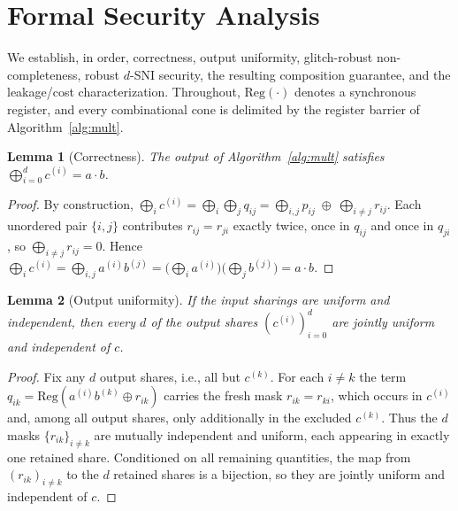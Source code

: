 \documentclass[lettersize,journal]{IEEEtran}
\newtheorem{lemma}{Lemma}
\newcommand{\share}[2]{#1^{(#2)}}
\begin{document}
\section{Formal Security Analysis}
\label{sec:security}
We establish, in order, correctness, output uniformity, glitch-robust
non-completeness, robust $d$-SNI security, the resulting composition guarantee,
and the leakage/cost characterization. Throughout, $\mathrm{Reg}(\cdot)$ denotes
a synchronous register, and every combinational cone is delimited by the
register barrier of Algorithm~\ref{alg:mult}.

\begin{lemma}[Correctness]
\label{lem:correct}
The output of Algorithm~\ref{alg:mult} satisfies
$\bigoplus_{i=0}^{d}\share{c}{i}=a\cdot b$.
\end{lemma}
\begin{proof}
By construction,
$\bigoplus_i\share{c}{i}=\bigoplus_{i}\bigoplus_{j}q_{ij}
=\bigoplus_{i,j}p_{ij}\;\oplus\;\bigoplus_{i\neq j}r_{ij}$.
Each unordered pair $\{i,j\}$ contributes $r_{ij}=r_{ji}$ exactly twice, once in
$q_{ij}$ and once in $q_{ji}$, so $\bigoplus_{i\neq j}r_{ij}=0$. Hence
$\bigoplus_i\share{c}{i}=\bigoplus_{i,j}\share{a}{i}\share{b}{j}
=\big(\bigoplus_i\share{a}{i}\big)\big(\bigoplus_j\share{b}{j}\big)=a\cdot b$.
\end{proof}

\begin{lemma}[Output uniformity]
\label{lem:unif}
If the input sharings are uniform and independent, then every $d$ of the output
shares $(\share{c}{i})_{i=0}^{d}$ are jointly uniform and independent of $c$.
\end{lemma}
\begin{proof}
Fix any $d$ output shares, i.e., all but $\share{c}{k}$. For each $i\neq k$ the
term $q_{ik}=\mathrm{Reg}(\share{a}{i}\share{b}{k}\oplus r_{ik})$ carries the
fresh mask $r_{ik}=r_{ki}$, which occurs in $\share{c}{i}$ and, among all output
shares, only additionally in the excluded $\share{c}{k}$. Thus the $d$ masks
$\{r_{ik}\}_{i\neq k}$ are mutually independent and uniform, each appearing in
exactly one retained share. Conditioned on all remaining quantities, the map
from $(r_{ik})_{i\neq k}$ to the $d$ retained shares is a bijection, so they are
jointly uniform and independent of $c$.
\end{proof}
\end{document}
